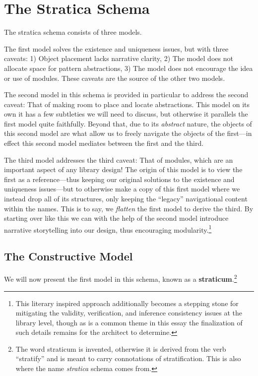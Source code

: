 \documentclass[twoside]{article}
\newcommand{\strong}[1]{{\bfseries #1}}
\begin{document}
\section*{The Stratica Schema}

The stratica schema consists of three models.

The first model solves the existence and uniqueness issues, but with three caveats: 1) Object placement lacks narrative
clarity, 2) The model does not allocate space for pattern abstractions, 3) The model does not encourage the idea or use
of modules. These caveats are the source of the other two models.

The second model in this schema is provided in particular to address the second caveat: That of making room to place and
locate abstractions. This model on its own it has a few subtleties we will need to discuss, but otherwise it parallels the
first model quite faithfully. Beyond that, due to its \emph{abstract} nature, the objects of this second model are what allow
us to freely navigate the objects of the first---in effect this second model mediates between the first and the third.

The third model addresses the third caveat: That of modules, which are an important aspect of any library design!
The origin of this model is to view the first as a reference---thus keeping our original solutions to the existence and
uniqueness issues---but to otherwise make a copy of this first model where we instead drop all of its structures, only
keeping the ``legacy'' navigational content within the names. This is to say, we \emph{flatten} the first model to derive
the third. By starting over like this we can with the help of the second model introduce narrative storytelling into
our design, thus encouraging modularity.\footnote{This literary inspired approach additionally becomes a stepping stone
for mitigating the validity, verification, and inference consistency issues at the library level, though as is a common
theme in this essay the finalization of such details remains for the architect to determine.}

\subsection*{The Constructive Model}

We will now present the first model in this schema, known as a \strong{straticum}.\footnote{The word straticum is invented,
otherwise it is derived from the verb ``stratify'' and is meant to carry connotations of stratification. This is also
where the name \emph{stratica} schema comes from.}
\end{document}
